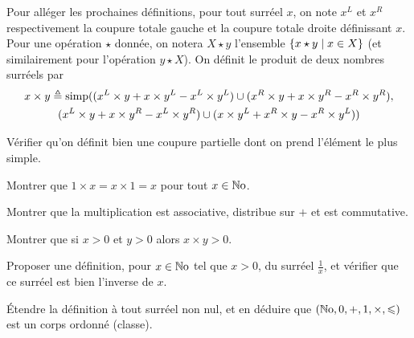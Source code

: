 \begin{problem}
  Pour alléger les prochaines définitions, pour tout surréel $x$, on note
  $x^L$ et $x^R$ respectivement la coupure totale gauche et la coupure totale
  droite définissant $x$. Pour une opération $\star$ donnée, on notera
  $X\mathbin{\star} y$ l'ensemble $\left\{ x \mathbin{\star} y \;\middle\vert\; x \in X \right\}$
  (et similairement pour l'opération $y\mathbin{\star} X$). On définit le
  produit de deux nombres surréels par
  \begin{multline*}
    x\times y \triangleq \operatorname{simp}(
    (x^L\times y + x \times y^L - x^L\times y^L)\cup
    (x^R\times y + x\times y^R -x^R\times y^R),\\
    (x^L\times y+x\times y^R - x^L\times y^R)\cup
    (x\times y^L+x^R\times y - x^R\times y^L))
  \end{multline*}
  \begin{pbQuest}[resume]
  \item Vérifier qu'on définit bien une coupure partielle dont on prend
    l'élément le plus simple.
  \item Montrer que $1 \times x = x \times 1 = x$ pour tout $x \in\mathbb{N}\mathrm{o}$.
  \item Montrer que la multiplication est associative, distribue sur $+$ et est
    commutative.
  \item Montrer que si $x > 0$ et $y > 0$ alors $x \times y > 0$.
  \item Proposer une définition, pour $x \in \mathbb{N}\mathrm{o}$ tel que $x > 0$, du surréel
    $\frac{1}{x}$, et vérifier que ce surréel est bien l'inverse de $x$.
  \item \'Etendre la définition à tout surréel non nul, et en déduire que
    $(\mathbb{N}\mathrm{o},0,+,1,\times,\leqslant)$ est un corps ordonné (classe).
  \end{pbQuest}
\end{problem}
